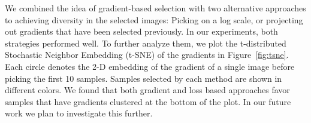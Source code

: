 We combined the idea of gradient-based selection with two alternative approaches to achieving diversity in the selected images: Picking on a log scale, or projecting out gradients that have been selected previously. In our experiments, both strategies performed well. To further analyze them, we plot the t-distributed Stochastic Neighbor Embedding (t-SNE) of the gradients in Figure~\ref{fig:tsne}. Each circle denotes the 2-D embedding of the gradient of a single image before picking the first 10 samples. Samples selected by each method are shown in different colors. We found that both gradient and loss based approaches favor samples that have gradients clustered at the bottom of the plot. In our future work we plan to investigate this further.



